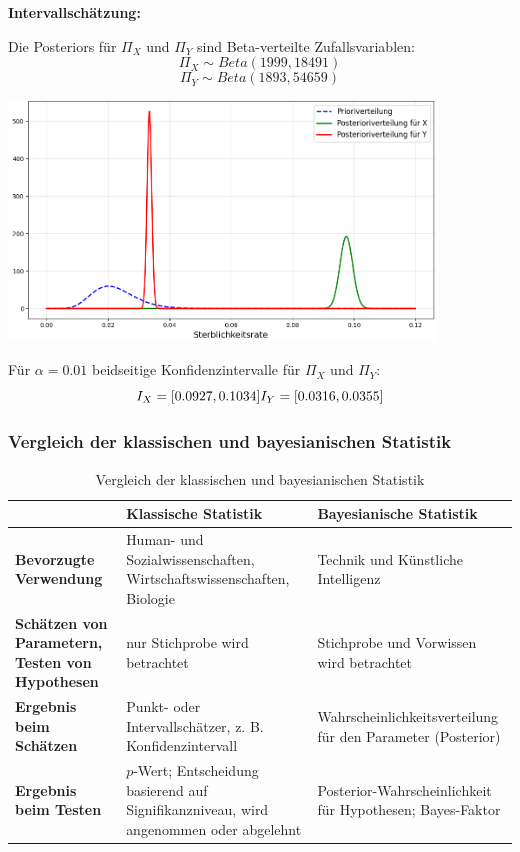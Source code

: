 \documentclass[a4paper,12pt]{article}
\begin{document}
\textbf{Intervallschätzung:}

Die Posteriors für $\Pi_X$ und $\Pi_Y$ sind Beta-verteilte Zufallsvariablen:
\begin{equation}
  \Pi_X \sim Beta(1999, 18491)
\end{equation}
\begin{equation}
  \Pi_Y \sim Beta(1893, 54659)
\end{equation}

\begin{center}
  \includegraphics[width=0.85\textwidth]{../images/semmelweis.png}
\end{center}

Für $\alpha = 0.01$ beidseitige Konfidenzintervalle für $\Pi_X$ und $\Pi_Y$:
\begin{equation}
  I_X = [0.0927, 0.1034] \\
  I_Y = [0.0316, 0.0355]
\end{equation}

\subsubsection{Vergleich der klassischen und bayesianischen Statistik}

\begin{table}[h!]
  \centering
  \begin{tabular}{|p{3cm}|p{5cm}|p{6cm}|}
    \hline
    \textbf{} & \textbf{Klassische Statistik} & \textbf{Bayesianische Statistik} \\ \hline
    \textbf{Bevorzugte Verwendung} & Human- und Sozialwissenschaften, Wirtschaftswissenschaften, Biologie & Technik und Künstliche Intelligenz \\ 
    \hline
    \textbf{Schätzen von Parametern, Testen von Hypothesen} & nur Stichprobe wird betrachtet & Stichprobe und Vorwissen wird betrachtet \\
    \hline
    \textbf{Ergebnis beim Schätzen} & Punkt- oder Intervallschätzer, z. B. Konfidenzintervall & Wahrscheinlichkeitsverteilung für den Parameter (Posterior) 
    \\ \hline
  \textbf{Ergebnis beim Testen} & \(p\)-Wert; Entscheidung basierend auf Signifikanzniveau, wird angenommen oder abgelehnt & Posterior-Wahrscheinlichkeit für Hypothesen; Bayes-Faktor \\ 
  \hline
  \end{tabular}
  \caption{Vergleich der klassischen und bayesianischen Statistik}
  \label{tab:vergleich_verwendung}
\end{table}
\end{document}
